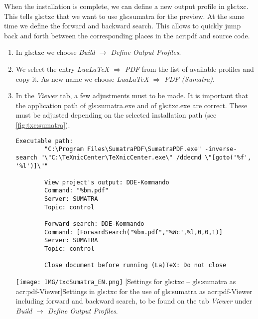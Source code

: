 When the installation is complete, we can define a new output profile in \gls{gls:txc}. This tells \gls{gls:txc} that we want to use \gls{gls:sumatra} for the preview. At the same time we define the forward and backward search. This allows to quickly jump back and forth between the corresponding places in the \ac{acr:pdf} and source code.
\begin{enumerate}
	\item In \gls{gls:txc} we choose \textit{Build $\rightarrow$ Define Output Profiles}.
	\item We select the entry \textit{LuaLaTeX $\Rightarrow$ PDF} from the list of available profiles and copy it. As new name we choose \textit{LuaLaTeX $\Rightarrow$ PDF (Sumatra)}.
	\item In the \textit{Viewer} tab, a few adjustments must to be made. It is important that the application path of \gls{gls:sumatra}.exe and of \gls{gls:txc}.exe are correct. These must be adjusted depending on the selected installation path (see \autoref{fig:txc:sumatra}).
	
	\begin{minipage}{\linewidth}
		\begin{lstlisting}[language=none, caption={[Settings for \gls{gls:txc} -- \gls{gls:sumatra} as \ac{acr:pdf}-Viewer]Settings in \gls{gls:txc} for the use of \gls{gls:sumatra} as \ac{acr:pdf}-Viewer including forward and backward search, to be found on the tab \textit{Viewer} under \textit{Build $\rightarrow$ Define Output Profiles}.}]
		Executable path:
		"C:\Program Files\SumatraPDF\SumatraPDF.exe" -inverse-search "\"C:\TeXnicCenter\TeXnicCenter.exe\" /ddecmd \"[goto('%f', '%l')]\""
		
		View project's output: DDE-Kommando
		Command: "%bm.pdf"
		Server: SUMATRA
		Topic: control
		
		Forward search: DDE-Kommando
		Command: [ForwardSearch("%bm.pdf","%Wc",%l,0,0,1)]
		Server: SUMATRA
		Topic: control
		
		Close document before running (La)TeX: Do not close
		\end{lstlisting}
	\end{minipage}%
	
	\begin{minipage}{\linewidth}
		\centering
		\texttt{[image: IMG/txcSumatra\_EN.png]}
		[Settings for \gls{gls:txc} -- \gls{gls:sumatra} as \ac{acr:pdf}-Viewer]{Settings in \gls{gls:txc} for the use of \gls{gls:sumatra} as \ac{acr:pdf}-Viewer including forward and backward search, to be found on the tab \textit{Viewer} under \textit{Build $\rightarrow$ Define Output Profiles}.}
		\label{fig:txc:sumatra}
	\end{minipage}%
\end{enumerate}



